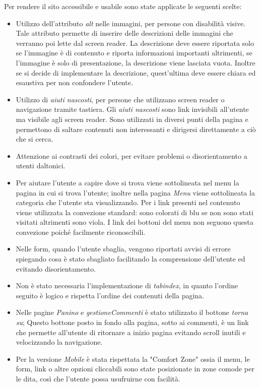 Per rendere il sito accessibile e usabile sono state applicate le seguenti scelte: 
	\begin{itemize}
		\item Utilizzo dell'attributo \emph{alt} nelle immagini, per persone con disabilità visive.
		 Tale attributo permette di inserire delle descrizioni delle immagini che verranno poi lette dal screen reader. 
		 La descrizione deve essere riportata solo se l'immagine è di contenuto e riporta informazioni importanti altrimenti, se l'immagine è solo di presentazione, la descrizione viene lasciata vuota.
		 Inoltre se si decide di implementare la descrizione, quest'ultima deve essere chiara ed esaustiva per non confondere l'utente.
		\item Utilizzo di \emph{aiuti nascosti}, per persone che utilizzano screen reader o navigazione tramite tastiera. 
		Gli \emph{aiuti nascosti} sono link invisibili all'utente ma visibile agli screen reader.
		 Sono utilizzati in diversi punti della pagina e permettono di saltare contenuti non interessanti e dirigersi direttamente a ciò che si cerca.
		\item Attenzione ai contrasti dei colori, per evitare problemi o disorientamento a utenti daltonici. 
		\item Per aiutare l'utente a capire dove si trova viene sottolineata nel menu la pagina in cui si trova l'utente; inoltre nella pagina \emph{Menu} viene sottolineata la categoria che l'utente sta visualizzando.
		Per i link presenti nel contenuto viene utilizzata la convezione standard: sono colorati di blu se non sono stati visitati altrimenti sono viola.
		I link dei bottoni del menu non seguono questa convezione poiché facilmente riconoscibili.
		\item Nelle form, quando l'utente sbaglia, vengono riportati avvisi di errore spiegando cosa è stato sbagliato facilitando la comprensione dell'utente ed evitando disorientamento.
		\item Non è stato necessaria l'implementazione di \emph{tabindex}, in quanto l'ordine seguito è logico e rispetta l'ordine dei contenuti della pagina. %
		\item Nelle pagine \emph{Panino} e \emph{gestioneCommenti} è stato utilizzato il bottone \emph{torna su}; Questo bottone posto in fondo alla pagina, sotto ai commenti, è un link che permette all'utente di ritornare a inizio pagina evitando scroll inutili e velocizzando la navigazione. 
		\item Per la versione \emph{Mobile} è stata rispettata la "Comfort Zone" ossia il menu, le form, link o altre opzioni cliccabili sono state posizionate in zone comode per le dita, così che l'utente possa usufruirne con facilità. 
	\end{itemize}